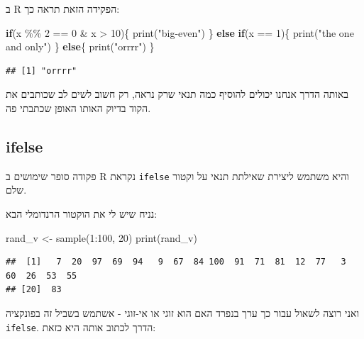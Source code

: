 \documentclass[
]{book}
\newenvironment{Shaded}{\begin{snugshade}}{\end{snugshade}}
\newcommand{\ControlFlowTok}[1]{\textcolor[rgb]{0.13,0.29,0.53}{\textbf{#1}}}
\newcommand{\DecValTok}[1]{\textcolor[rgb]{0.00,0.00,0.81}{#1}}
\newcommand{\FunctionTok}[1]{\textcolor[rgb]{0.00,0.00,0.00}{#1}}
\newcommand{\NormalTok}[1]{#1}
\newcommand{\OtherTok}[1]{\textcolor[rgb]{0.56,0.35,0.01}{#1}}
\newcommand{\SpecialCharTok}[1]{\textcolor[rgb]{0.00,0.00,0.00}{#1}}
\newcommand{\StringTok}[1]{\textcolor[rgb]{0.31,0.60,0.02}{#1}}
\begin{document}
ב
R
הפקידה הזאת תראה כך:

\begin{Shaded}
\begin{Highlighting}[]
\ControlFlowTok{if}\NormalTok{(x }\SpecialCharTok{\%\%} \DecValTok{2} \SpecialCharTok{==} \DecValTok{0} \SpecialCharTok{\&}\NormalTok{ x }\SpecialCharTok{\textgreater{}} \DecValTok{10}\NormalTok{)\{}
  \FunctionTok{print}\NormalTok{(}\StringTok{"big{-}even"}\NormalTok{)}
\NormalTok{\} }\ControlFlowTok{else} \ControlFlowTok{if}\NormalTok{(x }\SpecialCharTok{==} \DecValTok{1}\NormalTok{)\{}
  \FunctionTok{print}\NormalTok{(}\StringTok{"the one and only"}\NormalTok{)}
\NormalTok{\} }\ControlFlowTok{else}\NormalTok{\{}
  \FunctionTok{print}\NormalTok{(}\StringTok{"orrrr"}\NormalTok{)}
\NormalTok{\}}
\end{Highlighting}
\end{Shaded}

\begin{verbatim}
## [1] "orrrr"
\end{verbatim}

באותה הדרך אנחנו יכולים להוסיף כמה תנאי שרק נראה, רק חשוב לשים לב שכותבים את הקוד בדיוק האותו האופן שכתבתי פה.

\hypertarget{ifelse}{%
\subsection{ifelse}\label{ifelse}}

פקודה סופר שימושים ב
R
נקראת
\texttt{ifelse}
והיא משתמש ליצירת שאילתת תנאי על וקטור שלם.

נניח שיש לי את הוקטור הרנדומלי הבא:

\begin{Shaded}
\begin{Highlighting}[]
\NormalTok{rand\_v }\OtherTok{\textless{}{-}} \FunctionTok{sample}\NormalTok{(}\DecValTok{1}\SpecialCharTok{:}\DecValTok{100}\NormalTok{, }\DecValTok{20}\NormalTok{)}
\FunctionTok{print}\NormalTok{(rand\_v)}
\end{Highlighting}
\end{Shaded}

\begin{verbatim}
##  [1]   7  20  97  69  94   9  67  84 100  91  71  81  12  77   3  60  26  53  55
## [20]  83
\end{verbatim}

ואני רוצה לשאול עבור כך ערך בנפרד האם הוא זוגי או אי-זוגי - אשתמש בשביל זה בפונקציה\\
\texttt{ifelse}. הדרך לכתוב אותה היא כזאת:
\end{document}

